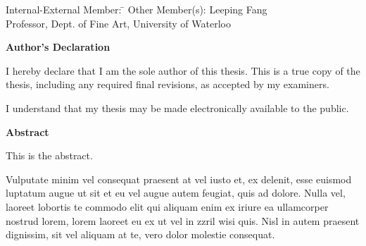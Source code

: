 \documentclass[letterpaper,12pt,titlepage,oneside,final]{book}
\let\origdoublepage\cleardoublepage
\newcommand{\clearemptydoublepage}{%
  \clearpage{\pagestyle{empty}\origdoublepage}}
\let\cleardoublepage\clearemptydoublepage
\begin{document}
  \noindent
\begin{tabbing}
Internal-External Member: \=  \kill %
Other Member(s): \> Leeping Fang \\
\> Professor, Dept. of Fine Art, University of Waterloo \\
\end{tabbing}

\cleardoublepage
{}    %

 \begin{center}\textbf{Author's Declaration}\end{center}

 \noindent
I hereby declare that I am the sole author of this thesis. This is a true copy of the thesis, including any required final revisions, as accepted by my examiners.
 \noindent  
  \bigskip
  
  \noindent
I understand that my thesis may be made electronically available to the public.

\cleardoublepage
{}    %

\begin{center}\textbf{Abstract}\end{center}

This is the abstract.

Vulputate minim vel consequat praesent at vel iusto et, ex delenit, esse euismod luptatum augue ut sit et eu vel augue autem feugiat, quis ad dolore. Nulla vel, laoreet lobortis te commodo elit qui aliquam enim ex iriure ea ullamcorper nostrud lorem, lorem laoreet eu ex ut vel in zzril wisi quis. Nisl in autem praesent dignissim, sit vel aliquam at te, vero dolor molestie consequat.
\end{document}
